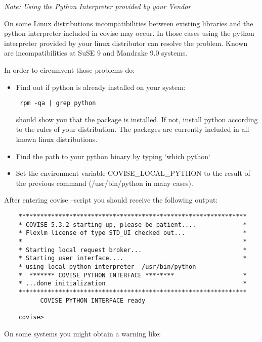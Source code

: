 {\it Note: Using the Python Interpreter provided by your Vendor}
\newline

On some Linux distributions incompatibilities between existing libraries and 
the python interpreter included in covise may occur. In those cases  
using  the python interpreter provided by your linux distributor can resolve 
the problem. Known are incompatibilities at SuSE 9 and Mandrake 9.0 systems. 
\newline

In order to circumvent those problems do:

\begin{itemize}
\item Find out if python is already installed on your system:  
\begin{verbatim} rpm -qa | grep python\end{verbatim}
  should show you that the package is installed. If not, install python 
  according to the rules of your distribution. The packages are currently 
  included in all known linux distributions.
\item Find the path to your python binary by typing `which python` 
\item Set the environment variable COVISE\_LOCAL\_PYTHON to the result of the 
  previous command (/usr/bin/python in many cases).
\end{itemize}

After entering covise --script    you should receive the following output:

\begin{verbatim}
	***************************************************************
	* COVISE 5.3.2 starting up, please be patient....             *
	* Flexlm license of type STD_UI checked out...                *
	*                                                             *
	* Starting local request broker...                            *
	* Starting user interface....                                 *
	* using local python interpreter  /usr/bin/python
	*  ******* COVISE PYTHON INTERFACE ********                   *
	* ...done initialization                                      *
	***************************************************************
		  COVISE PYTHON INTERFACE ready

	covise>
\end{verbatim}

On some systems you might obtain a warning like:\newline

